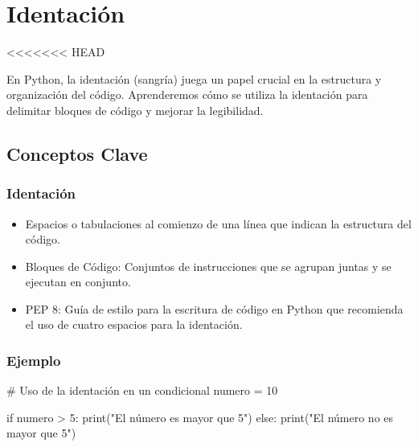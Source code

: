 \documentclass[
  a4paper,
  DIV=11,
  numbers=noendperiod,
  onepage,
  openany]{scrreprt}
\newenvironment{Shaded}{\begin{snugshade}}{\end{snugshade}}
\newcommand{\BuiltInTok}[1]{\textcolor[rgb]{0.00,0.23,0.31}{#1}}
\newcommand{\CommentTok}[1]{\textcolor[rgb]{0.37,0.37,0.37}{#1}}
\newcommand{\ControlFlowTok}[1]{\textcolor[rgb]{0.00,0.23,0.31}{#1}}
\newcommand{\DecValTok}[1]{\textcolor[rgb]{0.68,0.00,0.00}{#1}}
\newcommand{\NormalTok}[1]{\textcolor[rgb]{0.00,0.23,0.31}{#1}}
\newcommand{\OperatorTok}[1]{\textcolor[rgb]{0.37,0.37,0.37}{#1}}
\newcommand{\StringTok}[1]{\textcolor[rgb]{0.13,0.47,0.30}{#1}}
\providecommand{\tightlist}{%
  \setlength{\itemsep}{0pt}\setlength{\parskip}{0pt}}\usepackage{longtable,booktabs,array}
\begin{document}
\hypertarget{identaciuxf3n}{%
\chapter{Identación}\label{identaciuxf3n}}

\textless\textless\textless\textless\textless\textless\textless{} HEAD

En Python, la identación (sangría) juega un papel crucial en la
estructura y organización del código. Aprenderemos cómo se utiliza la
identación para delimitar bloques de código y mejorar la legibilidad.

\hypertarget{conceptos-clave-6}{%
\section{Conceptos Clave}\label{conceptos-clave-6}}

\hypertarget{identaciuxf3n-1}{%
\subsection{Identación}\label{identaciuxf3n-1}}

\begin{itemize}
\tightlist
\item
  Espacios o tabulaciones al comienzo de una línea que indican la
  estructura del código.
\item
  Bloques de Código: Conjuntos de instrucciones que se agrupan juntas y
  se ejecutan en conjunto.
\item
  PEP 8: Guía de estilo para la escritura de código en Python que
  recomienda el uso de cuatro espacios para la identación.
\end{itemize}

\hypertarget{ejemplo-6}{%
\subsection{Ejemplo}\label{ejemplo-6}}

\begin{Shaded}
\begin{Highlighting}[]
\CommentTok{\# Uso de la identación en un condicional}
\NormalTok{numero }\OperatorTok{=} \DecValTok{10}

\ControlFlowTok{if}\NormalTok{ numero }\OperatorTok{\textgreater{}} \DecValTok{5}\NormalTok{:}
    \BuiltInTok{print}\NormalTok{(}\StringTok{"El número es mayor que 5"}\NormalTok{)}
\ControlFlowTok{else}\NormalTok{:}
    \BuiltInTok{print}\NormalTok{(}\StringTok{"El número no es mayor que 5"}\NormalTok{)}
\end{Highlighting}
\end{Shaded}
\end{document}
